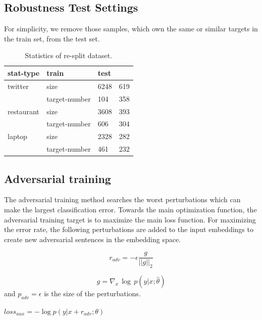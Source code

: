 \documentclass[fyp]{socreport}
\begin{document}
\subsection{Robustness Test Settings}
For simplicity, we remove those samples, which own the same or similar targets in the train set, from the test set.

\begin{table}[]
    \centering
    \caption{
		Statistics of re-split dataset.\\
	}
    \begin{tabular}{llll}
    \hline
    stat-type  & train         & test &     \\ \hline
    twitter    & size          & 6248 & 619 \\ \hline
               & target-number & 104  & 358 \\ \hline
    restaurant & size          & 3608 & 393 \\ \hline
               & target-number & 606  & 304 \\ \hline
    laptop     & size          & 2328 & 282 \\ \hline
               & target-number & 461  & 232 \\ \hline
    \end{tabular}
\end{table}

\subsection{Adversarial training}
The adversarial training method searches the worst perturbations which can make the largest classification error. Towards the main optimization function, the adversarial training target is to maximize the main loss function. For maximizing the error rate, the following perturbations are added to the input embeddings to create new adversarial sentences in the embedding space. 

\begin{equation}
r_{adv} = -\epsilon \frac{g}{||g||_2}
\end{equation} 

\begin{equation}
    g = \nabla_{x}\, \log\,  p(y|x;\hat{\theta})
\end{equation} and $p_{adv}=\epsilon$ is the size of the perturbations.

\begin{center}
	$loss_{aux}=- \log p(y|x + r_{adv};\theta)$
\end{center}
\end{document}
